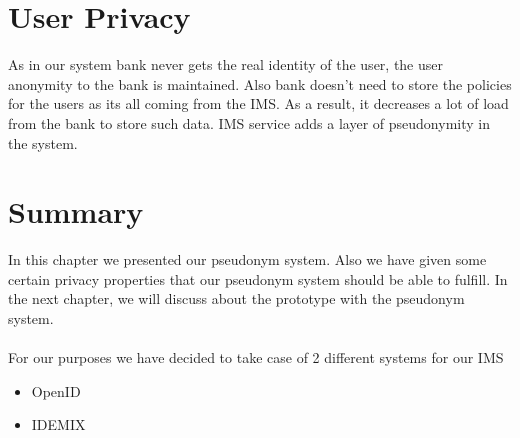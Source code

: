 \section{User Privacy}
As in our system bank never gets the real identity of the user, the user anonymity to the bank is maintained. Also bank doesn't need to store the policies for the users as its all coming from the IMS. As a result, it decreases a lot of load from the bank to store such data. IMS service adds a layer of pseudonymity in the system. 

\section{Summary}
In this chapter we presented our pseudonym system. Also we have given some certain privacy properties that our pseudonym system should be able to fulfill. In the next chapter, we will discuss about the prototype with the pseudonym system.
\\
\\For our purposes we have decided to take case of 2 different systems for our IMS
\begin{itemize}
	\item OpenID
	\item IDEMIX
\end{itemize}